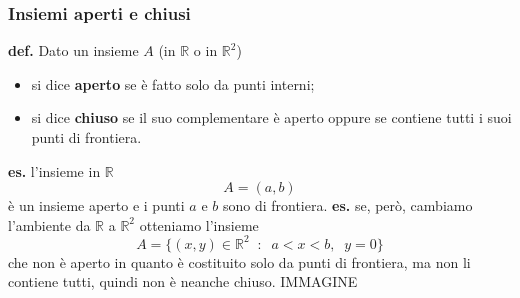 \subsubsection*{Insiemi aperti e chiusi}
\textbf{def.} Dato un insieme $A$ (in $\mathbb{R}$ o in $\mathbb{R}^2$)
\begin{itemize}
    \item si dice \textbf{aperto} se è fatto solo da punti interni;
    \item si dice \textbf{chiuso} se il suo complementare è aperto oppure se contiene tutti i suoi punti di frontiera.
\end{itemize}
\textbf{es.} l'insieme in $\mathbb{R}$
\[
    A = (a,b)
\] 
è un insieme aperto e i punti $a$ e $b$ sono di frontiera.
\newline
\textbf{es.} se, però, cambiamo l'ambiente da $\mathbb{R}$ a $\mathbb{R}^2$ otteniamo l'insieme
\[
    A = \{(x,y) \in \mathbb{R}^2 \;\;:\;\; a < x < b ,\;\; y = 0\}
\] 
che non è aperto in quanto è costituito solo da punti di frontiera, ma non li contiene tutti, quindi non è neanche chiuso.
\newline
IMMAGINE
\newpage